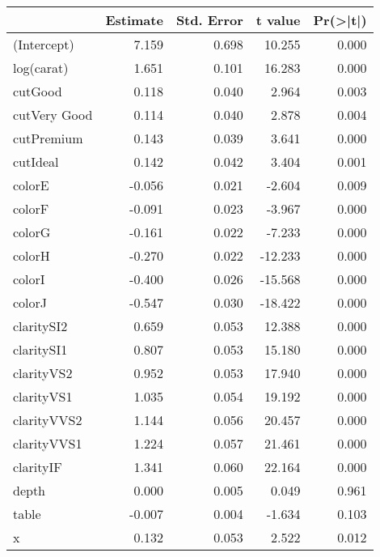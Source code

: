 \documentclass[]{book}
\newenvironment{Shaded}{\begin{snugshade}}{\end{snugshade}}
\newcommand{\CommentTok}[1]{\textcolor[rgb]{0.56,0.35,0.01}{\textit{#1}}}
\newcommand{\DecValTok}[1]{\textcolor[rgb]{0.00,0.00,0.81}{#1}}
\newcommand{\NormalTok}[1]{#1}
\newcommand{\OperatorTok}[1]{\textcolor[rgb]{0.81,0.36,0.00}{\textbf{#1}}}
\newcommand{\StringTok}[1]{\textcolor[rgb]{0.31,0.60,0.02}{#1}}
\theoremstyle{definition}
\theoremstyle{definition}
\theoremstyle{definition}
\theoremstyle{remark}
\begin{document}
\begin{tabular}{l|r|r|r|r}
\hline
  & Estimate & Std. Error & t value & Pr(>|t|)\\
\hline
(Intercept) & 7.159 & 0.698 & 10.255 & 0.000\\
\hline
log(carat) & 1.651 & 0.101 & 16.283 & 0.000\\
\hline
cutGood & 0.118 & 0.040 & 2.964 & 0.003\\
\hline
cutVery Good & 0.114 & 0.040 & 2.878 & 0.004\\
\hline
cutPremium & 0.143 & 0.039 & 3.641 & 0.000\\
\hline
cutIdeal & 0.142 & 0.042 & 3.404 & 0.001\\
\hline
colorE & -0.056 & 0.021 & -2.604 & 0.009\\
\hline
colorF & -0.091 & 0.023 & -3.967 & 0.000\\
\hline
colorG & -0.161 & 0.022 & -7.233 & 0.000\\
\hline
colorH & -0.270 & 0.022 & -12.233 & 0.000\\
\hline
colorI & -0.400 & 0.026 & -15.568 & 0.000\\
\hline
colorJ & -0.547 & 0.030 & -18.422 & 0.000\\
\hline
claritySI2 & 0.659 & 0.053 & 12.388 & 0.000\\
\hline
claritySI1 & 0.807 & 0.053 & 15.180 & 0.000\\
\hline
clarityVS2 & 0.952 & 0.053 & 17.940 & 0.000\\
\hline
clarityVS1 & 1.035 & 0.054 & 19.192 & 0.000\\
\hline
clarityVVS2 & 1.144 & 0.056 & 20.457 & 0.000\\
\hline
clarityVVS1 & 1.224 & 0.057 & 21.461 & 0.000\\
\hline
clarityIF & 1.341 & 0.060 & 22.164 & 0.000\\
\hline
depth & 0.000 & 0.005 & 0.049 & 0.961\\
\hline
table & -0.007 & 0.004 & -1.634 & 0.103\\
\hline
x & 0.132 & 0.053 & 2.522 & 0.012\\
\hline
\end{tabular}

\begin{Shaded}
\end{Shaded}
\end{document}
